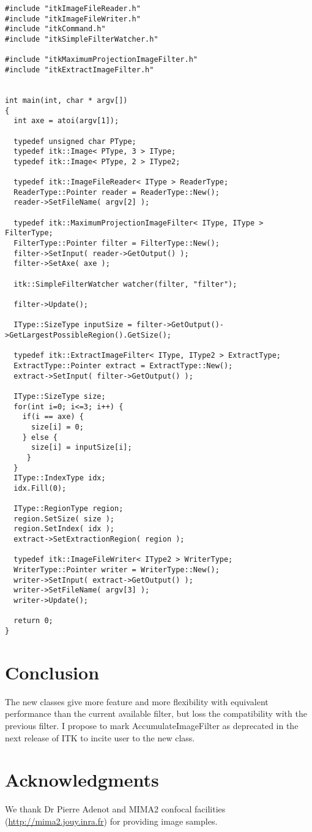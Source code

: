 \documentclass{InsightArticle}
\begin{document}
\small \begin{verbatim}
#include "itkImageFileReader.h"
#include "itkImageFileWriter.h"
#include "itkCommand.h"
#include "itkSimpleFilterWatcher.h"

#include "itkMaximumProjectionImageFilter.h"
#include "itkExtractImageFilter.h"


int main(int, char * argv[])
{
  int axe = atoi(argv[1]);

  typedef unsigned char PType;
  typedef itk::Image< PType, 3 > IType;
  typedef itk::Image< PType, 2 > IType2;

  typedef itk::ImageFileReader< IType > ReaderType;
  ReaderType::Pointer reader = ReaderType::New();
  reader->SetFileName( argv[2] );

  typedef itk::MaximumProjectionImageFilter< IType, IType > FilterType;
  FilterType::Pointer filter = FilterType::New();
  filter->SetInput( reader->GetOutput() );
  filter->SetAxe( axe );

  itk::SimpleFilterWatcher watcher(filter, "filter");

  filter->Update();

  IType::SizeType inputSize = filter->GetOutput()->GetLargestPossibleRegion().GetSize();

  typedef itk::ExtractImageFilter< IType, IType2 > ExtractType;
  ExtractType::Pointer extract = ExtractType::New();
  extract->SetInput( filter->GetOutput() );

  IType::SizeType size;
  for(int i=0; i<=3; i++) {
    if(i == axe) {
      size[i] = 0;
    } else {
      size[i] = inputSize[i];
     }
  }
  IType::IndexType idx;
  idx.Fill(0);

  IType::RegionType region;
  region.SetSize( size );
  region.SetIndex( idx );
  extract->SetExtractionRegion( region );

  typedef itk::ImageFileWriter< IType2 > WriterType;
  WriterType::Pointer writer = WriterType::New();
  writer->SetInput( extract->GetOutput() );
  writer->SetFileName( argv[3] );
  writer->Update();

  return 0;
}
\end{verbatim} \normalsize

\section{Conclusion}
The new classes give more feature and more flexibility with equivalent
performance than the current available filter, but loss the compatibility with
the previous filter. I propose to mark AccumulateImageFilter as deprecated in
the next release of ITK to incite user to the new class.


\section{Acknowledgments}
We thank Dr Pierre Adenot and MIMA2 confocal facilities
(\url{http://mima2.jouy.inra.fr})
for providing image samples.


\appendix





\nocite{ITKSoftwareGuide}
\end{document}
